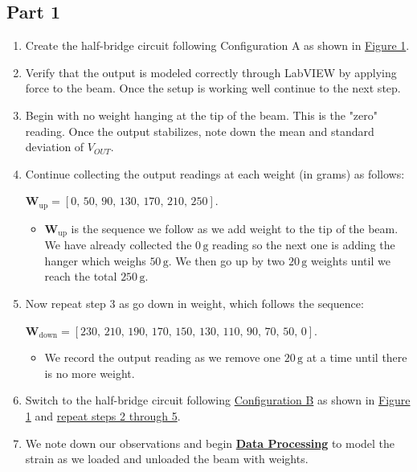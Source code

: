 \documentclass{article}
\begin{document}
\subsection{Part 1}
\begin{enumerate}
    \item Create the half-bridge circuit following Configuration A as shown in \hyperlink{fig1}{Figure 1}. 
    \item Verify that the output is modeled correctly through LabVIEW by applying force to the beam. Once the setup is working well continue to the next step.
    \item Begin with no weight hanging at the tip of the beam. This is the "zero" reading. Once the output stabilizes, note down the mean and standard deviation of $V_{OUT}$.
    \item Continue collecting the output readings at each weight (in grams) as follows:
    \vspace{0.5mm}
    
    $\textbf{W}_{\text{up}} = \left[0,\, 50,\, 90,\, 130,\, 170,\, 210,\, 250\right]$. 
    \begin{itemize}
        \item $\textbf{W}_{\text{up}}$ is the sequence we follow as we add weight to the tip of the beam. We have already collected the $0\, \text{g}$ reading so the next one is adding the hanger which weighs $50\, \text{g}$. We then go up by two $20\, \text{g}$ weights until we reach the total $250\, \text{g}$.
    \end{itemize}
    
    \item Now repeat step 3 as go down in weight, which follows the sequence:
    \vspace{0.5mm}
    
    $\textbf{W}_{\text{down}} = \left[230,\, 210,\, 190,\, 170,\, 150,\, 130,\, 110,\, 90,\, 70,\, 50,\, 0\right]$.
    \begin{itemize}
        \item We record the output reading as we remove one $20\, \text{g}$ at a time until there is no more weight. 
    \end{itemize}

    \item Switch to the half-bridge circuit following \underline{Configuration B} as shown in \hyperlink{fig1}{Figure 1} and \ul{repeat steps 2 through 5}.

    \item We note down our observations and begin \hyperlink{datapro}{\textbf{Data Processing}} to model the strain as we loaded and unloaded the beam with weights.
\end{enumerate}
\end{document}
